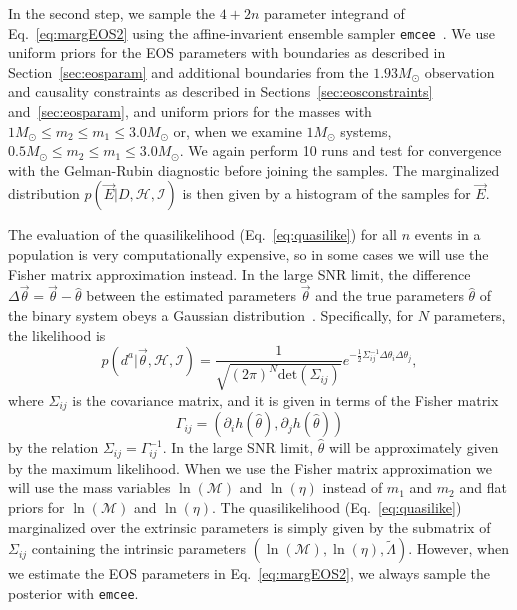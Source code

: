 \documentclass[twocolumn,prd,amssymb,aps,nofootinbib,showpacs,epsf]{revtex4}
\begin{document}
In the second step, we sample the $4+2n$ parameter integrand of Eq.~\eqref{eq:margEOS2} using the affine-invarient ensemble sampler \texttt{emcee}~\cite{ForemanMackeyHogg2013}. We use uniform priors for the EOS parameters with boundaries as described in Section~\ref{sec:eosparam} and additional boundaries from the $1.93M_\odot$ observation and causality constraints as described in Sections~\ref{sec:eosconstraints} and~\ref{sec:eosparam}, and uniform priors for the masses with $1M_\odot \le m_2 \le m_1 \le 3.0M_\odot$ or, when we examine $1M_\odot$ systems, $0.5M_\odot \le m_2 \le m_1 \le 3.0M_\odot$. We again perform 10 runs and test for convergence with the Gelman-Rubin diagnostic before joining the samples. The marginalized distribution $p(\vec E|D, \mathcal{H}, \mathcal{I})$ is then given by a histogram of the samples for $\vec E$.

The evaluation of the quasilikelihood (Eq.~\eqref{eq:quasilike}) for all $n$ events in a population is very computationally expensive, so in some cases we will use the Fisher matrix approximation instead. In the large SNR limit, the difference $\Delta\vec\theta = \vec\theta - \hat\theta$ between the estimated parameters $\vec\theta$ and the true parameters $\hat\theta$ of the binary system obeys a Gaussian distribution~\cite{FinnChernoff1993}. Specifically, for $N$ parameters, the likelihood is
\begin{equation}
\label{eq:gaussianlike}
p(d^a | \vec\theta,\mathcal{H},\mathcal{I}) = \frac{1}{\sqrt{(2\pi)^N \mathrm{det}(\Sigma_{ij})}} e^{-\frac{1}{2} \Sigma^{-1}_{ij} \Delta\theta_i \Delta\theta_j},
\end{equation}
where $\Sigma_{ij}$ is the covariance matrix, and it is given in terms of the Fisher matrix
\begin{equation}
\Gamma_{ij} = (\partial_i h(\hat\theta), \partial_j h(\hat\theta))
\end{equation}
by the relation $\Sigma_{ij}  = \Gamma^{-1}_{ij}$. In the large SNR limit, $\hat\theta$ will be approximately given by the maximum likelihood. When we use the Fisher matrix approximation we will use the mass variables $\ln(\mathcal{M})$ and $\ln(\eta)$ instead of $m_1$ and $m_2$ and flat priors for $\ln(\mathcal{M})$ and $\ln(\eta)$. The quasilikelihood (Eq.~\eqref{eq:quasilike}) marginalized over the extrinsic parameters is simply given by the submatrix of $\Sigma_{ij}$ containing the intrinsic parameters $(\ln(\mathcal{M}), \ln(\eta), \tilde\Lambda)$. However, when we estimate the EOS parameters in Eq.~\eqref{eq:margEOS2}, we always sample the posterior with \texttt{emcee}.
\end{document}

